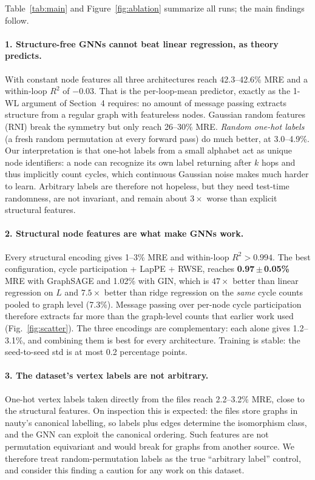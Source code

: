 Table~\ref{tab:main} and Figure~\ref{fig:ablation} summarize all runs; the main findings follow.

\paragraph{1. Structure-free GNNs cannot beat linear regression, as theory predicts.}
With constant node features all three architectures reach 42.3--42.6\% MRE and a within-loop $R^2$
of $-0.03$. That is the per-loop-mean predictor, exactly as the 1-WL argument of
Section~4 requires: no amount of message passing extracts structure from a regular graph with
featureless nodes. Gaussian random features (RNI) break the symmetry but only reach 26--30\% MRE.
\emph{Random one-hot labels} (a fresh random permutation at every forward pass) do much
better, at 3.0--4.9\%. Our interpretation is that one-hot labels from a small alphabet act as unique node
identifiers: a node can recognize its own label returning after $k$ hops and thus implicitly count
cycles, which continuous Gaussian noise makes much harder to learn. Arbitrary labels are therefore
not hopeless, but they need test-time randomness, are not invariant, and remain about $3\times$ worse than
explicit structural features.

\paragraph{2. Structural node features are what make GNNs work.} Every structural encoding gives
1--3\% MRE and within-loop $R^2>0.994$. The best configuration, cycle participation + LapPE + RWSE,
reaches \textbf{0.97\,$\pm$\,0.05\%} MRE with GraphSAGE and 1.02\% with GIN, which is $47\times$ better than linear
regression on $L$ and $7.5\times$ better than ridge regression on the \emph{same} cycle counts pooled to
graph level (7.3\%). Message passing over per-node cycle participation therefore extracts far
more than the graph-level counts that earlier work used (Fig.~\ref{fig:scatter}). The three
encodings are complementary: each alone gives 1.2--3.1\%, and combining them is best for every
architecture. Training is stable: the seed-to-seed std is at most 0.2 percentage points.

\paragraph{3. The dataset's vertex labels are not arbitrary.} One-hot vertex labels taken directly
from the files reach 2.2--3.2\% MRE, close to the structural features. On inspection this is
expected: the files store graphs in nauty's canonical labelling, so labels plus edges determine
the isomorphism class, and the GNN can exploit the canonical ordering. Such features are not
permutation equivariant and would break for graphs from another source. We therefore treat
random-permutation labels as the true ``arbitrary label'' control, and consider this finding a
caution for any work on this dataset.

